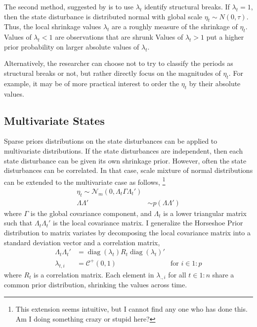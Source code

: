 \documentclass{article}
\newcommand{\dist}[1]{\mathcal{#1}}
\newcommand{\paren}[1]{\ensuremath{\left(#1\right)}}
\newcommand{\dmvnorm}[2]{\ensuremath{\dist{N}_{#2}\paren{#1}}}
\newcommand{\dhalfcauchy}[1]{\ensuremath{\dist{C}^{+}\paren{#1}}}
\DeclareMathOperator{\diag}{diag}
\begin{document}
The second method, suggested by \textcite[179-180]{PetrisPetroneEtAl2009} is to use $\lambda_{t}$ identify structural breaks.
If $\lambda_{t} = 1$, then the state disturbance is distributed normal with global scale $\eta_{t} \sim N(0, \tau)$.
Thus, the local shrinkage values $\lambda_{t}$ are a roughly measure of the shrinkage of $\eta_{t}$.
Values of $\lambda_{t} < 1$ are observations that are shrunk
Values of $\lambda_{t} > 1$ put a higher prior probability on larger absolute values of $\lambda_{t}$.

Alternatively, the researcher can choose not to try to classify the periods as structural breaks or not, but rather directly focus on the magnitudes of $\eta_{t}$.
For example, it may be of more practical interest to order the $\eta_{t}$ by their absolute values.

\subsection{Multivariate States}
\label{sec:multivariate}

Sparse priors distributions on the state disturbances can be applied to multivariate distributions.
If the state disturbances are independent, then each state disturbance can be given its own shrinkage prior.
However, often the state disturbances can be correlated. In that case, scale mixture of normal distributions can be extended to the multivariate case as follows,%
\footnote{
  This extension seems intuitive, but I cannot find any one who has done this.
  Am I doing something crazy or stupid here? 
}
\begin{align}
  \label{eq:12}
  \eta_{t} \sim \dmvnorm{0, \Lambda_{t} \Gamma \Lambda_{t}'}{m} \\
  \label{eq:13}
  \Lambda \Lambda' & \sim p(\Lambda \Lambda')
\end{align}
where $\Gamma$ is the global covariance component, and $\Lambda_{t}$ is a lower triangular matrix such that  $\Lambda_{t} \Lambda_{t}'$ is the local covariance matrix.
I generalize the Horseshoe Prior distribution to matrix variates by decomposing the local covariance matrix into a standard deviation vector and a correlation matrix,
\begin{align}
  \label{eq:16}
  \Lambda_{t} \Lambda_{t}' &= \diag(\lambda_{t}) R_{t} \diag(\lambda_{t})' \\
  \label{eq:17}
  \lambda_{t,i} &= \dhalfcauchy{0, 1} & \text{for $i \in 1:p$}
\end{align}
where $R_{t}$ is a correlation matrix.
Each element in $\lambda_{.,i}$ for all $t \in 1:n$ share a common prior distribution, shrinking the values across time.
\end{document}
